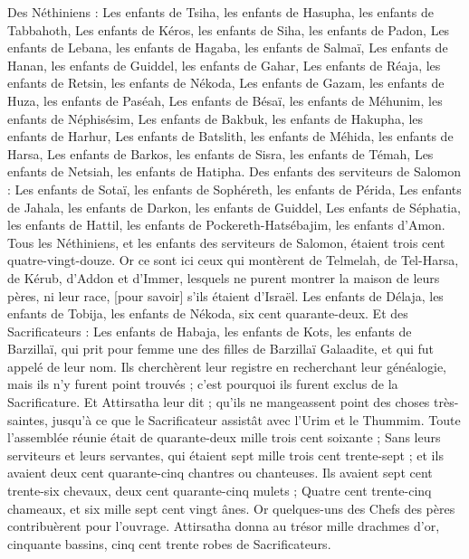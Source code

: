 \begin{multicols}{2}
Des Néthiniens : Les enfants de Tsiha, les enfants de Hasupha, les enfants de Tabbahoth,
Les enfants de Kéros, les enfants de Siha, les enfants de Padon,
Les enfants de Lebana, les enfants de Hagaba, les enfants de Salmaï,
Les enfants de Hanan, les enfants de Guiddel, les enfants de Gahar,
Les enfants de Réaja, les enfants de Retsin, les enfants de Nékoda,
Les enfants de Gazam, les enfants de Huza, les enfants de Paséah,
Les enfants de Bésaï, les enfants de Méhunim, les enfants de Néphisésim,
Les enfants de Bakbuk, les enfants de Hakupha, les enfants de Harhur,
Les enfants de Batslith, les enfants de Méhida, les enfants de Harsa,
Les enfants de Barkos, les enfants de Sisra, les enfants de Témah,
Les enfants de Netsiah, les enfants de Hatipha.
Des enfants des serviteurs de Salomon : Les enfants de Sotaï, les enfants de Sophéreth, les enfants de Périda,
Les enfants de Jahala, les enfants de Darkon, les enfants de Guiddel,
Les enfants de Séphatia, les enfants de Hattil, les enfants de Pockereth-Hatsébajim, les enfants d'Amon.
Tous les Néthiniens, et les enfants des serviteurs de Salomon, étaient trois cent quatre-vingt-douze.
Or ce sont ici ceux qui montèrent de Telmelah, de Tel-Harsa, de Kérub, d'Addon et d'Immer, lesquels ne purent montrer la maison de leurs pères, ni leur race, [pour savoir] s'ils étaient d'Israël.
Les enfants de Délaja, les enfants de Tobija, les enfants de Nékoda, six cent quarante-deux.
Et des Sacrificateurs : Les enfants de Habaja, les enfants de Kots, les enfants de Barzillaï, qui prit pour femme une des filles de Barzillaï Galaadite, et qui fut appelé de leur nom.
Ils cherchèrent leur registre en recherchant leur généalogie, mais ils n'y furent point trouvés ; c'est pourquoi ils furent exclus de la Sacrificature.
Et Attirsatha leur dit ; qu'ils ne mangeassent point des choses très-saintes, jusqu'à ce que le Sacrificateur assistât avec l'Urim et le Thummim.
Toute l'assemblée réunie était de quarante-deux mille trois cent soixante ;
Sans leurs serviteurs et leurs servantes, qui étaient sept mille trois cent trente-sept ; et ils avaient deux cent quarante-cinq chantres ou chanteuses.
Ils avaient sept cent trente-six chevaux, deux cent quarante-cinq mulets ;
Quatre cent trente-cinq chameaux, et six mille sept cent vingt ânes.
Or quelques-uns des Chefs des pères contribuèrent pour l'ouvrage. Attirsatha donna au trésor mille drachmes d'or, cinquante bassins, cinq cent trente robes de Sacrificateurs.

\end{multicols}
